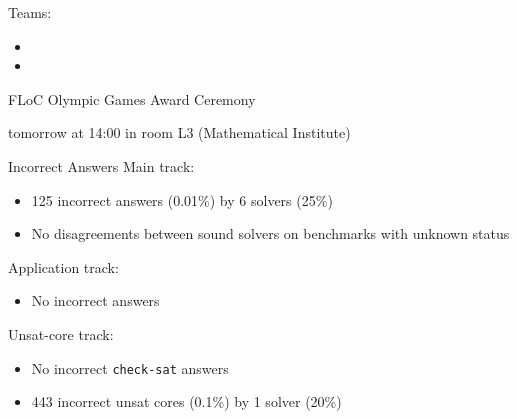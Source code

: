 \documentclass{beamer}
\begin{document}

\begin{frame}{}
  Teams:
  \begin{itemize}
  \item {}
  \item {}
  \end{itemize}

  \bigskip
  \bigskip

  \begin{center}
    FLoC Olympic Games Award Ceremony

    \medskip

    tomorrow at 14:00 in room L3 (Mathematical Institute)
  \end{center}
\end{frame}


\begin{frame}{}
  \begin{center}
    \vfill
      {\huge {}}
    \vfill
  \end{center}
\end{frame}


\begin{frame}{Incorrect Answers}
  Main track:
  \begin{itemize}
  \item 125 incorrect answers (0.01\%) by 6 solvers (25\%)
  \item No disagreements between sound solvers on benchmarks with
    unknown status
  \end{itemize}

  \bigskip

  Application track:
  \begin{itemize}
  \item No incorrect answers
  \end{itemize}

  \bigskip

  Unsat-core track:
  \begin{itemize}
  \item No incorrect \texttt{check-sat} answers
  \item 443 incorrect unsat cores (0.1\%) by 1 solver (20\%)
  \end{itemize}
\end{frame}

\end{document}
